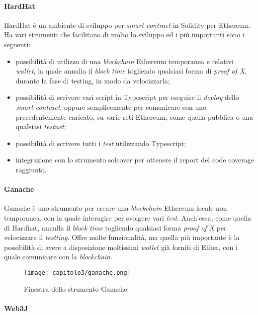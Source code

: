 \paragraph{HardHat}
HardHat è un ambiente di sviluppo per \textit{smart contract} in Solidity per Ethereum. Ha vari strumenti che facilitano di molto lo sviluppo ed i più importanti sono i seguenti:
\begin{itemize}
  \item possibilità di utilizzo di una \textit{blockchain} Ethereum temporanea e relativi \textit{wallet}, la quale annulla il \textit{block time} togliendo qualsiasi forma di \textit{proof of X}, durante la fase di testing, in modo da velocizzarla;
  \item possibilità di scrivere vari script in Typescript per eseguire il \textit{deploy} dello \textit{smart contract}, oppure semplicemente per comunicare con uno precedentemente caricato, su varie reti Ethereum, come quella pubblica o una qualsiasi \textit{testnet};
  \item possibilità di scrivere tutti i \textit{test} utilizzando Typescript;
  \item integrazione con lo strumento solcover per ottenere il report del code coverage raggiunto.
\end{itemize}

\paragraph{Ganache}
Ganache è uno strumento per creare una \textit{blockchain} Ethereum locale non temporanea, con la quale interagire per svolgere vari \textit{test}. Anch'essa, come quella di Hardhat, annulla il \textit{block time} togliendo qualsiasi forma \textit{proof of X} per velocizzare il \textit{testting}. Offre molte funzionalità, ma quella più importante è la possibilità di avere a disposizione moltissimi \textit{wallet} già forniti di Ether, con i quale comunicare con la \textit{blockchain}.

\begin{figure}[h!]
  \centering
  \texttt{[image: capitolo3/ganache.png]}
  \caption{Finestra dello strumento Ganache}
\end{figure}

\paragraph{Web3J}


